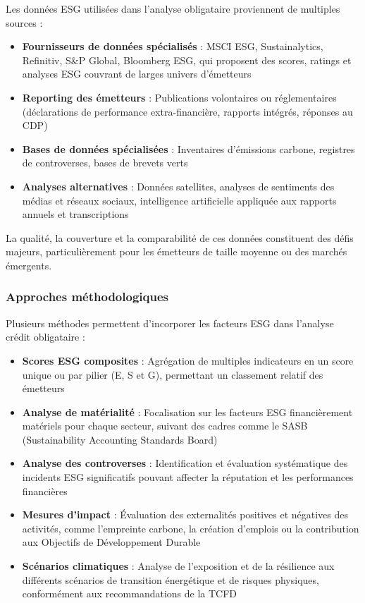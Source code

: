 Les données ESG utilisées dans l'analyse obligataire proviennent de multiples sources :

\begin{itemize}
    \item \textbf{Fournisseurs de données spécialisés} : MSCI ESG, Sustainalytics, Refinitiv, S\&P Global, Bloomberg ESG, qui proposent des scores, ratings et analyses ESG couvrant de larges univers d'émetteurs
    
    \item \textbf{Reporting des émetteurs} : Publications volontaires ou réglementaires (déclarations de performance extra-financière, rapports intégrés, réponses au CDP)
    
    \item \textbf{Bases de données spécialisées} : Inventaires d'émissions carbone, registres de controverses, bases de brevets verts
    
    \item \textbf{Analyses alternatives} : Données satellites, analyses de sentiments des médias et réseaux sociaux, intelligence artificielle appliquée aux rapports annuels et transcriptions
\end{itemize}

La qualité, la couverture et la comparabilité de ces données constituent des défis majeurs, particulièrement pour les émetteurs de taille moyenne ou des marchés émergents.

\subsubsection{Approches méthodologiques}

Plusieurs méthodes permettent d'incorporer les facteurs ESG dans l'analyse crédit obligataire :

\begin{itemize}
    \item \textbf{Scores ESG composites} : Agrégation de multiples indicateurs en un score unique ou par pilier (E, S et G), permettant un classement relatif des émetteurs
    
    \item \textbf{Analyse de matérialité} : Focalisation sur les facteurs ESG financièrement matériels pour chaque secteur, suivant des cadres comme le SASB (Sustainability Accounting Standards Board)
    
    \item \textbf{Analyse des controverses} : Identification et évaluation systématique des incidents ESG significatifs pouvant affecter la réputation et les performances financières
    
    \item \textbf{Mesures d'impact} : Évaluation des externalités positives et négatives des activités, comme l'empreinte carbone, la création d'emplois ou la contribution aux Objectifs de Développement Durable
    
    \item \textbf{Scénarios climatiques} : Analyse de l'exposition et de la résilience aux différents scénarios de transition énergétique et de risques physiques, conformément aux recommandations de la TCFD
\end{itemize}

